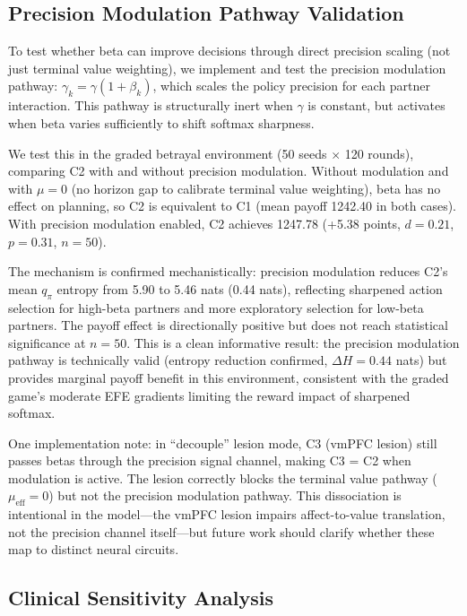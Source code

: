 \documentclass[11pt,a4paper]{article}
\begin{document}
\subsection{Precision Modulation Pathway Validation}

To test whether beta can improve decisions through direct precision scaling (not just terminal value weighting), we implement and test the precision modulation pathway: $\gamma_k = \gamma(1 + \beta_k)$, which scales the policy precision for each partner interaction. This pathway is structurally inert when $\gamma$ is constant, but activates when beta varies sufficiently to shift softmax sharpness.

We test this in the graded betrayal environment (50 seeds $\times$ 120 rounds), comparing C2 with and without precision modulation. Without modulation and with $\mu = 0$ (no horizon gap to calibrate terminal value weighting), beta has no effect on planning, so C2 is equivalent to C1 (mean payoff 1242.40 in both cases). With precision modulation enabled, C2 achieves 1247.78 (+5.38 points, $d = 0.21$, $p = 0.31$, $n = 50$).

The mechanism is confirmed mechanistically: precision modulation reduces C2's mean $q_\pi$ entropy from 5.90 to 5.46 nats (0.44 nats), reflecting sharpened action selection for high-beta partners and more exploratory selection for low-beta partners. The payoff effect is directionally positive but does not reach statistical significance at $n = 50$. This is a clean informative result: the precision modulation pathway is technically valid (entropy reduction confirmed, $\Delta H = 0.44$ nats) but provides marginal payoff benefit in this environment, consistent with the graded game's moderate EFE gradients limiting the reward impact of sharpened softmax.

One implementation note: in ``decouple'' lesion mode, C3 (vmPFC lesion) still passes betas through the precision signal channel, making C3 = C2 when modulation is active. The lesion correctly blocks the terminal value pathway ($\mu_\text{eff} = 0$) but not the precision modulation pathway. This dissociation is intentional in the model---the vmPFC lesion impairs affect-to-value translation, not the precision channel itself---but future work should clarify whether these map to distinct neural circuits.

\subsection{Clinical Sensitivity Analysis}
\end{document}
